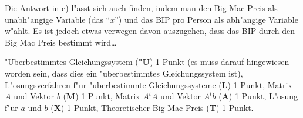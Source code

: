 \begin{diskussion}
Die Antwort in c) l"asst sich auch finden, indem man den Big Mac Preis
als unabh"angige Variable (das ``$x$'') und das BIP pro Person als
abh"angige Variable w"ahlt. 
Es ist jedoch etwas verwegen davon auszugehen, dass das BIP durch den
Big Mac Preis bestimmt wird\dots
\end{diskussion}

\begin{bewertung}
"Uberbestimmtes Gleichungssystem ({\bf "U}) 1 Punkt (es muss darauf hingewiesen
worden sein, dass dies ein "uberbestimmtes Gleichungssystem ist),
L"osungsverfahren f"ur "uberbestimmte Gleichungssysteme ({\bf L}) 1 Punkt,
Matrix $A$ und Vektor $b$ ({\bf M}) 1 Punkt,
Matrix $A^tA$ und Vektor $A^tb$ ({\bf A}) 1 Punkt,
L"osung f"ur $a$ und $b$ ({\bf X}) 1 Punkt,
Theoretischer Big Mac Preis ({\bf T}) 1 Punkt.
\end{bewertung}

